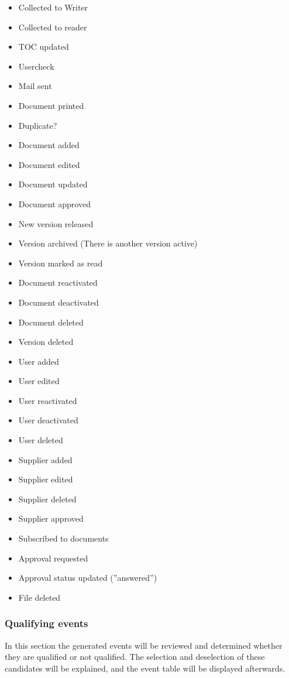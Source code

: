 \begin{itemize}
	\item Collected to Writer
	\item Collected to reader
	\item TOC updated
	\item Usercheck
	\item Mail sent
	\item Document printed
	\item Duplicate?
	\item Document added
	\item Document edited
	\item Document updated
	\item Document approved
	\item New version released
	\item Version archived (There is another version active)
	\item Version marked as read
	\item Document reactivated
	\item Document deactivated
	\item Document deleted
	\item Version deleted
	\item User added
	\item User edited
	\item User reactivated
	\item User deactivated
	\item User deleted
	\item Supplier added
	\item Supplier edited
	\item Supplier deleted
	\item Supplier approved
	\item Subscribed to documents
	\item Approval requested
	\item Approval status updated (''answered'')
	\item File deleted
\end{itemize}

\subsubsection{Qualifying events}
In this section the generated events will be reviewed and determined whether they are qualified or not qualified. The selection and deselection of these candidates will be explained, and the event table will be displayed afterwards.

